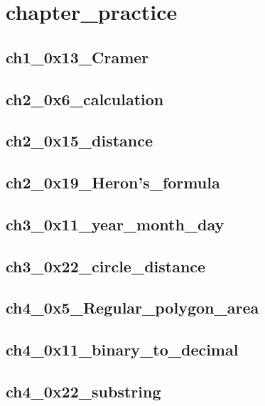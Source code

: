 \section{chapter_practice}
    \subsection{ch1_0x13_Cramer}
            
    \subsection{ch2_0x6_calculation}
        
    \subsection{ch2_0x15_distance}
        
    \subsection{ch2_0x19_Heron's_formula}
        
    \subsection{ch3_0x11_year_month_day}
        
    \subsection{ch3_0x22_circle_distance}
        
    \subsection{ch4_0x5_Regular_polygon_area}
        
    \subsection{ch4_0x11_binary_to_decimal}
        
    \subsection{ch4_0x22_substring}
        

